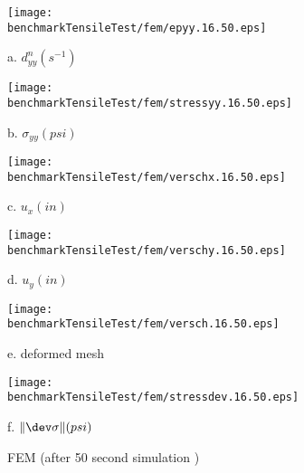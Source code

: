 \clearpage

\begin{figure}[h!]
\begin{minipage}[l]{7cm}
\texttt{[image: \\benchmarkTensileTest/fem/epyy.16.50.eps]}

a. $d^n_{yy}(s^{-1})$
\end{minipage}
\begin{minipage}[r]{7cm}  
 \texttt{[image: \\benchmarkTensileTest/fem/stressyy.16.50.eps]}

b. $\sigma_{yy}(psi)$
\end{minipage}
\begin{minipage}[l]{7cm}  
 \texttt{[image: \\benchmarkTensileTest/fem/verschx.16.50.eps]}

c. $u_x(in)$
\end{minipage}
\begin{minipage}[r]{7cm}  
 \texttt{[image: \\benchmarkTensileTest/fem/verschy.16.50.eps]}

d. $u_y(in)$
\end{minipage}
\begin{minipage}[l]{8.5cm}  
\texttt{[image: \\benchmarkTensileTest/fem/versch.16.50.eps]}

e. deformed mesh
\end{minipage}
\begin{minipage}[r]{7cm}  
\texttt{[image: \\benchmarkTensileTest/fem/stressdev.16.50.eps]}

 f. $\|\dev \sigma\|(psi)$ \\
\end{minipage}
\caption{FEM (after 50 second simulation )}\label{fig:Hart:FEM}
\end{figure} 

